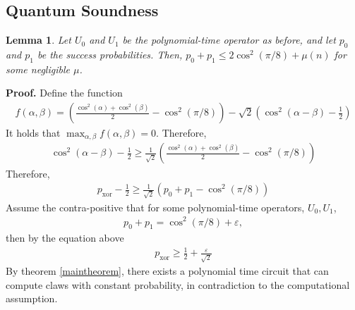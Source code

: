 \documentclass{article}
\newtheorem{lem}[thm]{Lemma}
\begin{document}
\subsection{Quantum Soundness}
\begin{lem}
\label{qsoundness}
Let $U_{0}$ and $U_{1}$ be the polynomial-time operator as before, and let $p_{0}$ and $p_{1}$ be the success probabilities. Then, $p_{0}+p_{1} \leq 2\cos^{2}(\pi/8)+\mu(n)$ for some negligible $\mu$.
\end{lem} \textbf{Proof.} Define the function 
\begin{align}
    f(\alpha, \beta)=\left(\frac{\cos^{2}(\alpha)+\cos^{2}(\beta)}{2} - \cos^{2}(\pi / 8)\right) - \sqrt{2}\left(\cos^{2}(\alpha-\beta)-\frac{1}{2}\right)
\end{align}
It holds that $\max_{\alpha, \beta}f(\alpha, \beta)=0$. Therefore,
\begin{align}
    \cos^{2}(\alpha-\beta)-\frac{1}{2} \geq \frac{1}{\sqrt{2}}\left(\frac{\cos^{2}(\alpha)+\cos^{2}(\beta)}{2} - \cos^{2}(\pi / 8)\right)
\end{align}
Therefore, \begin{align}
    p_{\mathrm{xor}}-\frac{1}{2}\geq \frac{1}{\sqrt{2}}(p_{0}+p_{1}-\cos^{2}(\pi/8))
\end{align}
Assume the contra-positive that for some polynomial-time operators, $U_{0},U_{1}$, \begin{align}p_{0}+p_{1} = \cos^{2}(\pi/8) + \varepsilon,\end{align}then by the equation above \begin{align}
    p_{\mathrm{xor}}\geq \frac{1}{2} + \frac{\varepsilon}{\sqrt{2}}
\end{align} By theorem \ref{maintheorem}, there exists a polynomial time circuit that can compute claws with constant probability, in contradiction to the computational assumption.
\end{document}
